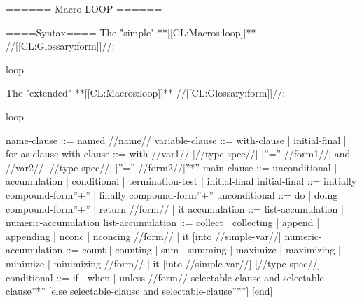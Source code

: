 ====== Macro LOOP ======

====Syntax====
The "simple" **[[CL:Macros:loop]]** //[[CL:Glossary:form]]//:

\DefmacWithValues loop {} {}

The "extended" **[[CL:Macros:loop]]** //[[CL:Glossary:form]]//:

\DefmacWithValues loop {  } {}

name-clause ::= named //name//
variable-clause ::= with-clause | initial-final | for-as-clause
with-clause ::= with //var1// [//type-spec//] [''='' //form1//] {and //var2// [//type-spec//] [''='' //form2//]}''*''
main-clause ::= unconditional | accumulation | conditional | termination-test | initial-final
initial-final ::= initially compound-form''+'' | finally compound-form''+''
unconditional ::= {do | doing} compound-form''+'' | return {//form// | it}
accumulation ::= list-accumulation | numeric-accumulation
list-accumulation ::= {collect | collecting | append | appending | nconc | nconcing} {//form// | it} [into //simple-var//]
numeric-accumulation ::= {count | counting | sum | summing | maximize | maximizing | minimize | minimizing} {//form// | it} [into //simple-var//] [//type-spec//]
conditional ::= {if | when | unless} //form// selectable-clause {and selectable-clause}''*'' [else selectable-clause {and selectable-clause}''*''] [end]

